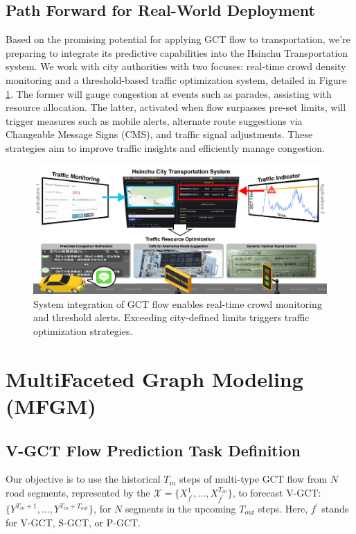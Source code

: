 \documentclass[letterpaper]{article} %
\begin{document}
\subsection{Path Forward for Real-World Deployment}
Based on the promising potential for applying GCT flow to transportation, we're preparing to integrate its predictive capabilities into the Hsinchu Transportation system. We work with city authorities with two focuses: real-time crowd density monitoring and a threshold-based traffic optimization system, detailed in Figure \ref{fig:applications}. The former will gauge congestion at events such as parades, assisting with resource allocation. The latter, activated when flow surpasses pre-set limits, will trigger measures such as mobile alerts, alternate route suggestions via Changeable Message Signs (CMS), and traffic signal adjustments. These strategies aim to improve traffic insights and efficiently manage congestion.
\begin{figure}[ht]
\centering
\includegraphics[width=0.95\linewidth]{Figure/gct_applications.png}
\caption{System integration of GCT flow enables real-time crowd monitoring and threshold alerts. Exceeding city-defined limits triggers traffic optimization strategies.}
\label{fig:applications}
\end{figure}

\clearpage

\section{MultiFaceted Graph Modeling (MFGM)}

\subsection{V-GCT Flow Prediction Task Definition}
Our objective is to use the historical $T_{in}$ steps of multi-type GCT flow from $N$ road segments, represented by the $\mathcal{X}=\{X_{f^{'}}^{1},...,X_{f^{'}}^{T_{in}}\}$, to forecast V-GCT: $\{{Y}^{T_{in}+1},...,{Y}^{T_{in}+T_{out}}\}$, for $N$ segments in the upcoming $T_{out}$ steps. Here, $f^{'}$ stands for V-GCT, S-GCT, or P-GCT.
\end{document}
